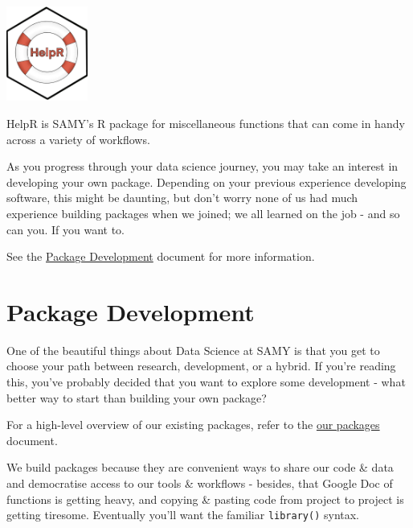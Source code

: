 \documentclass[
  letterpaper,
  DIV=11,
  numbers=noendperiod]{scrreprt}
\begin{document}
\includegraphics[width=0.2\textwidth,height=\textheight]{./img/hex/helpr.png}

HelpR is SAMY's R package for miscellaneous functions that can come in
handy across a variety of workflows.

As you progress through your data science journey, you may take an
interest in developing your own package. Depending on your previous
experience developing software, this might be daunting, but don't worry
none of us had much experience building packages when we joined; we all
learned on the job - and so can you. If you want to.

See the \href{package_development.qmd}{Package Development} document for
more information.

\chapter{Package Development}\label{package-development}

One of the beautiful things about Data Science at SAMY is that you get
to choose your path between research, development, or a hybrid. If
you're reading this, you've probably decided that you want to explore
some development - what better way to start than building your own
package?

\begin{tcolorbox}[enhanced jigsaw, colback=white, opacitybacktitle=0.6, coltitle=black, left=2mm, breakable, bottomtitle=1mm, toptitle=1mm, toprule=.15mm, colframe=quarto-callout-note-color-frame, titlerule=0mm, title=\textcolor{quarto-callout-note-color}{\faInfo}\hspace{0.5em}{Note}, colbacktitle=quarto-callout-note-color!10!white, rightrule=.15mm, bottomrule=.15mm, arc=.35mm, opacityback=0, leftrule=.75mm]

For a high-level overview of our existing packages, refer to the
\href{packages.qmd}{our packages} document.

\end{tcolorbox}

We build packages because they are convenient ways to share our code \&
data and democratise access to our tools \& workflows - besides, that
Google Doc of functions is getting heavy, and copying \& pasting code
from project to project is getting tiresome. Eventually you'll want the
familiar \texttt{library()} syntax.
\end{document}
